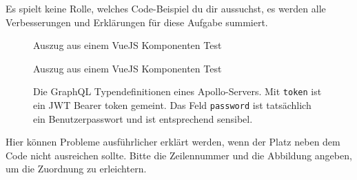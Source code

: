 \documentclass[addpoints]{exam}
\begin{document}
\begin{questions}
\begin{parts}
  Es spielt keine Rolle, welches Code-Beispiel du dir aussuchst, es werden alle
  Verbesserungen und Erklärungen für diese Aufgabe summiert.
\begin{figure}[h]
  
  \caption{Auszug aus einem VueJS Komponenten Test}
  \label{fig:apollo-server}
\end{figure}
\begin{figure}[h]
  
  \caption{Auszug aus einem VueJS Komponenten Test}
  \label{fig:apollo-server}
\end{figure}
\begin{figure}[h]
  
  \caption{Die GraphQL Typendefinitionen eines Apollo-Servers. Mit \texttt{token}
  ist ein JWT Bearer token gemeint. Das Feld \texttt{password} ist tatsächlich
  ein Benutzerpasswort und ist entsprechend sensibel.}
  \label{fig:apollo-server}
\end{figure}

\clearpage
  Hier können Probleme ausführlicher erklärt werden, wenn der Platz neben dem
  Code nicht ausreichen sollte. Bitte die Zeilennummer und die Abbildung
  angeben, um die Zuordnung zu erleichtern.

\end{parts}

\end{questions}
\end{document}

